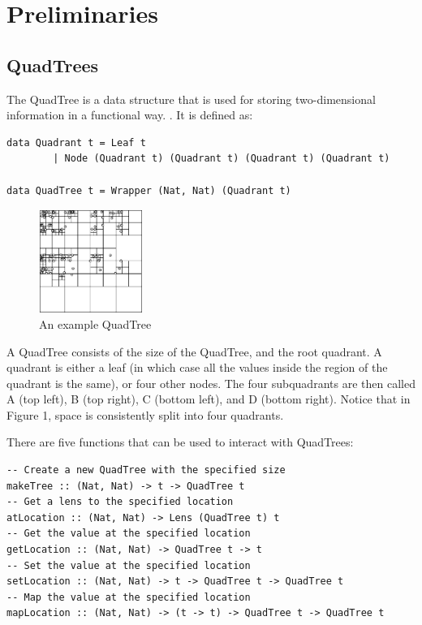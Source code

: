 \section{Preliminaries}
\subsection{QuadTrees}
The QuadTree is a data structure that is used for storing two-dimensional information in a functional way. \cite{Finkel1974}. It is defined as:
\begin{verbatim}
data Quadrant t = Leaf t
        | Node (Quadrant t) (Quadrant t) (Quadrant t) (Quadrant t)

data QuadTree t = Wrapper (Nat, Nat) (Quadrant t)
\end{verbatim}

\begin{figure} %
    \includegraphics[width=0.3\textwidth]{graphics/test.png}
    \caption{An example QuadTree}
\end{figure}

A QuadTree consists of the size of the QuadTree, and the root quadrant. A quadrant is either a leaf (in which case all the values inside the region of the quadrant is the same), or four other nodes. The four subquadrants are then called A (top left), B (top right), C (bottom left), and D (bottom right). Notice that in Figure 1, space is consistently split into four quadrants.

There are five functions that can be used to interact with QuadTrees:
\begin{verbatim}
-- Create a new QuadTree with the specified size
makeTree :: (Nat, Nat) -> t -> QuadTree t
-- Get a lens to the specified location
atLocation :: (Nat, Nat) -> Lens (QuadTree t) t
-- Get the value at the specified location
getLocation :: (Nat, Nat) -> QuadTree t -> t
-- Set the value at the specified location
setLocation :: (Nat, Nat) -> t -> QuadTree t -> QuadTree t
-- Map the value at the specified location
mapLocation :: (Nat, Nat) -> (t -> t) -> QuadTree t -> QuadTree t
\end{verbatim}

